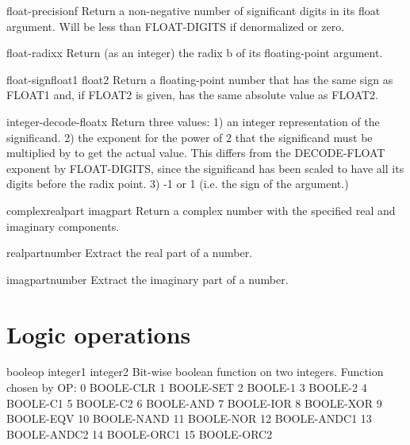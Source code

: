 \documentclass[10pt,english]{book}
\begin{document}
\begin{function}{float-precision}{f}
  Return a non-negative number of significant digits in its float argument.
  Will be less than FLOAT-DIGITS if denormalized or zero.
\end{function}

\begin{function}{float-radix}{x}
  Return (as an integer) the radix b of its floating-point argument.
\end{function}

\begin{function}{float-sign}{float1 \op float2}
  Return a floating-point number that has the same sign as
   FLOAT1 and, if FLOAT2 is given, has the same absolute value
   as FLOAT2.
\end{function}

\begin{function}{integer-decode-float}{x}
  Return three values:
   1) an integer representation of the significand.
   2) the exponent for the power of 2 that the significand must be multiplied
      by to get the actual value. This differs from the DECODE-FLOAT exponent
      by FLOAT-DIGITS, since the significand has been scaled to have all its
      digits before the radix point.
   3) -1 or 1 (i.e. the sign of the argument.)
\end{function}

\begin{function}{complex}{realpart \op imagpart}
  Return a complex number with the specified real and imaginary components.
\end{function}

\begin{function}{realpart}{number}
  Extract the real part of a number.
\end{function}

\begin{function}{imagpart}{number}
  Extract the imaginary part of a number.
\end{function}

\section{Logic operations}
\label{sec:logic-operations}

\begin{function}{boole}{op integer1 integer2}
  Bit-wise boolean function on two integers. Function chosen by OP:
        0       BOOLE-CLR
        1       BOOLE-SET
        2       BOOLE-1
        3       BOOLE-2
        4       BOOLE-C1
        5       BOOLE-C2
        6       BOOLE-AND
        7       BOOLE-IOR
        8       BOOLE-XOR
        9       BOOLE-EQV
        10      BOOLE-NAND
        11      BOOLE-NOR
        12      BOOLE-ANDC1
        13      BOOLE-ANDC2
        14      BOOLE-ORC1
        15      BOOLE-ORC2
\end{function}
\end{document}
